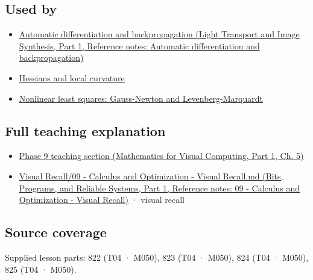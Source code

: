 \subsection{Used by}\label{appendix-d8a7ddb675eb-used-by}

\hypertarget{appendix-d8a7ddb675eb-used-by}{}

\begin{itemize}
\tightlist
\item
  \href{../04-Light-Transport-and-Image-Synthesis-P01/main.pdf\#appendix-40df0855b4a7}{Automatic differentiation and backpropagation (Light Transport and Image Synthesis, Part 1, Reference notes: Automatic differentiation and backpropagation)}
\item
  \hyperref[appendix-6ac071f8b50c]{Hessians and local curvature}
\item
  \hyperref[appendix-2c2df8345991]{Nonlinear least squares: Gauss-Newton and Levenberg-Marquardt}
\end{itemize}

\subsection{Full teaching explanation}\label{appendix-d8a7ddb675eb-full-teaching-explanation}

\hypertarget{appendix-d8a7ddb675eb-full-teaching-explanation}{}

\begin{itemize}
\tightlist
\item
  \href{../02-Mathematics-for-Visual-Computing-P01/main.pdf\#02-foundations-ii-ch021-jacobians-curvature-and-local-approximation}{Phase 9 teaching section (Mathematics for Visual Computing, Part 1, Ch. 5)}
\item
  \href{../01-Bits-Programs-and-Reliable-Systems-P01/main.pdf\#appendix-adf48f5dc5c1}{Visual Recall/09 - Calculus and Optimization - Visual Recall.md (Bits, Programs, and Reliable Systems, Part 1, Reference notes: 09 - Calculus and Optimization - Visual Recall)} · visual recall
\end{itemize}

\subsection{Source coverage}\label{appendix-d8a7ddb675eb-source-coverage}

\hypertarget{appendix-d8a7ddb675eb-source-coverage}{}

Supplied lesson parts: 822 (T04 · M050), 823 (T04 · M050), 824 (T04 · M050), 825 (T04 · M050).
